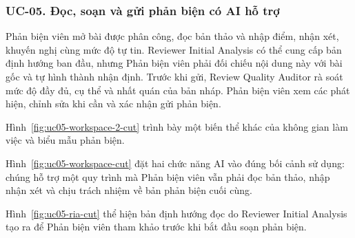 \subsubsection{UC-05. Đọc, soạn và gửi phản biện có AI hỗ trợ}

Phản biện viên mở bài được phân công, đọc bản thảo và nhập điểm, nhận xét, khuyến nghị cùng mức độ tự tin. Reviewer Initial Analysis có thể cung cấp bản định hướng ban đầu, nhưng Phản biện viên phải đối chiếu nội dung này với bài gốc và tự hình thành nhận định. Trước khi gửi, Review Quality Auditor rà soát mức độ đầy đủ, cụ thể và nhất quán của bản nháp. Phản biện viên xem các phát hiện, chỉnh sửa khi cần và xác nhận gửi phản biện.


Hình~\ref{fig:uc05-workspace-2-cut} trình bày một biến thể khác của không gian làm việc và biểu mẫu phản biện.


Hình~\ref{fig:uc05-workspace-cut} đặt hai chức năng AI vào đúng bối cảnh sử dụng: chúng hỗ trợ một quy trình mà Phản biện viên vẫn phải đọc bản thảo, nhập nhận xét và chịu trách nhiệm về bản phản biện cuối cùng.


Hình~\ref{fig:uc05-ria-cut} thể hiện bản định hướng đọc do Reviewer Initial Analysis tạo ra để Phản biện viên tham khảo trước khi bắt đầu soạn phản biện.


